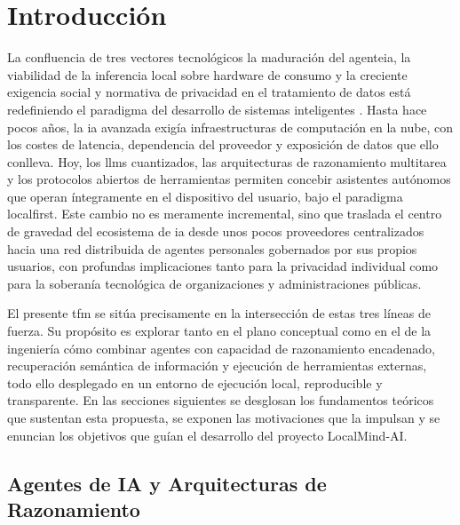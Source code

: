 
\section{Introducción}
La confluencia de tres vectores tecnológicos la maduración del \gls{agenteia}, la viabilidad de la inferencia local sobre \gls{hardware} de consumo y la creciente exigencia social y normativa de privacidad en el tratamiento de datos está redefiniendo el paradigma del desarrollo de sistemas inteligentes \cite{xi2023rise}. Hasta hace pocos años, la \gls{ia} avanzada exigía infraestructuras de computación en la nube, con los costes de latencia, dependencia del proveedor y exposición de datos que ello conlleva. Hoy, los \glspl{llm} cuantizados, las arquitecturas de razonamiento multitarea y los protocolos abiertos de herramientas permiten concebir asistentes autónomos que operan íntegramente en el dispositivo del usuario, bajo el paradigma \gls{localfirst}. Este cambio no es meramente incremental, sino que traslada el centro de gravedad del ecosistema de \gls{ia} desde unos pocos proveedores centralizados hacia una red distribuida de agentes personales gobernados por sus propios usuarios, con profundas implicaciones tanto para la privacidad individual como para la soberanía tecnológica de organizaciones y administraciones públicas.

El presente \gls{tfm} se sitúa precisamente en la intersección de estas tres líneas de fuerza. Su propósito es explorar tanto en el plano conceptual como en el de la ingeniería cómo combinar agentes con capacidad de razonamiento encadenado, recuperación semántica de información y ejecución de herramientas externas, todo ello desplegado en un entorno de ejecución local, reproducible y transparente. En las secciones siguientes se desglosan los fundamentos teóricos que sustentan esta propuesta, se exponen las motivaciones que la impulsan y se enuncian los objetivos que guían el desarrollo del proyecto LocalMind-AI.

\subsection{Agentes de IA y Arquitecturas de Razonamiento}
\label{subsec:agentes-ia}

